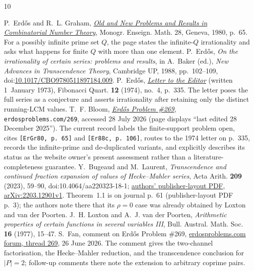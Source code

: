 \documentclass[11pt]{article}
\begin{document}
\begin{thebibliography}{10}
\small\raggedright
\setlength{\itemsep}{0pt}
 P.~Erd\H{o}s and R.~L. Graham,
  \href{https://mathweb.ucsd.edu/~ronspubs/80_11_number_theory.pdf}{\emph{Old
  and New Problems and Results in Combinatorial Number Theory}},
  Monogr. Enseign. Math. 28, Geneva, 1980, p.~65.  For a possibly infinite
  prime set $Q$, the page states the infinite-$Q$ irrationality and asks what
  happens for finite $Q$ with more than one element.
 P.~Erd\H{o}s, \emph{On the irrationality of certain series:
  problems and results}, in A.~Baker (ed.), \emph{New Advances in Transcendence
  Theory}, Cambridge UP, 1988, pp.~102--109,
  doi:\href{https://doi.org/10.1017/CBO9780511897184.009}{10.1017/CBO9780511897184.009}.
 P.~Erd\H{o}s,
  \href{https://www.fq.math.ca/Scanned/12-4/letter.pdf}{\emph{Letter to the
  Editor}} (written 1~January 1973), Fibonacci Quart. \textbf{12} (1974),
  no.~4, p.~335.  The letter poses the full series as a conjecture and asserts
  irrationality after retaining only the distinct running-LCM values.
 T.~F. Bloom,
  \href{https://www.erdosproblems.com/269}{\emph{Erd\H{o}s Problem \#269}},
  \texttt{erdosproblems.com/269}, accessed 28 July 2026 (page displays
  ``last edited 28 December 2025'').  The current record labels the
  finite-support problem open, cites \texttt{[ErGr80, p.~65]} and
  \texttt{[Er88c, p.~106]}, routes to the 1974 letter on p.~335, records the
  infinite-prime and de-duplicated variants, and explicitly describes its
  status as the website owner's present assessment rather than a
  literature-completeness guarantee.
 Y.~Bugeaud and M.~Laurent,
  \emph{Transcendence and continued fraction expansion of values of
  Hecke--Mahler series}, Acta Arith. \textbf{209} (2023), 59--90,
  doi:10.4064/aa220323-18-1;
  \href{https://irma.math.unistra.fr/~bugeaud/travaux/BuMLAA.pdf}
  {authors' publisher-layout PDF},
  \href{https://arxiv.org/abs/2203.12901}{arXiv:2203.12901v1}.
  Theorem~1.1 is on journal p.~61 (publisher-layout PDF p.~3); the authors
  note there that its $\rho=0$ case was already obtained by Loxton and van
  der Poorten.
 J.~H. Loxton and A.~J. van der Poorten,
  \emph{Arithmetic properties of certain functions in several variables III},
  Bull. Austral. Math. Soc. \textbf{16} (1977), 15--47.
 S.~Fan, comment on Erd\H{o}s Problem \#269,
  \href{https://www.erdosproblems.com/forum/thread/269}
  {erdosproblems.com forum, thread 269}, 26 June 2026.  The comment gives the
  two-channel factorisation, the Hecke--Mahler reduction, and the
  transcendence conclusion for $|P|=2$; follow-up comments there note the
  extension to arbitrary coprime pairs.
\end{thebibliography}

\companionpapercontext
\end{document}
